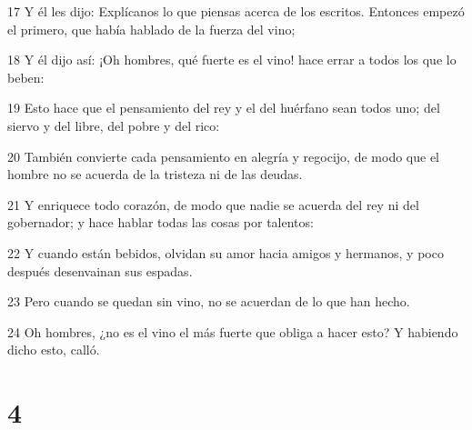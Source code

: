 \par 17 Y él les dijo: Explícanos lo que piensas acerca de los escritos. Entonces empezó el primero, que había hablado de la fuerza del vino;
\par 18 Y él dijo así: ¡Oh hombres, qué fuerte es el vino! hace errar a todos los que lo beben:
\par 19 Esto hace que el pensamiento del rey y el del huérfano sean todos uno; del siervo y del libre, del pobre y del rico:
\par 20 También convierte cada pensamiento en alegría y regocijo, de modo que el hombre no se acuerda de la tristeza ni de las deudas.
\par 21 Y enriquece todo corazón, de modo que nadie se acuerda del rey ni del gobernador; y hace hablar todas las cosas por talentos:
\par 22 Y cuando están bebidos, olvidan su amor hacia amigos y hermanos, y poco después desenvainan sus espadas.
\par 23 Pero cuando se quedan sin vino, no se acuerdan de lo que han hecho.
\par 24 Oh hombres, ¿no es el vino el más fuerte que obliga a hacer esto? Y habiendo dicho esto, calló.

\chapter{4}

